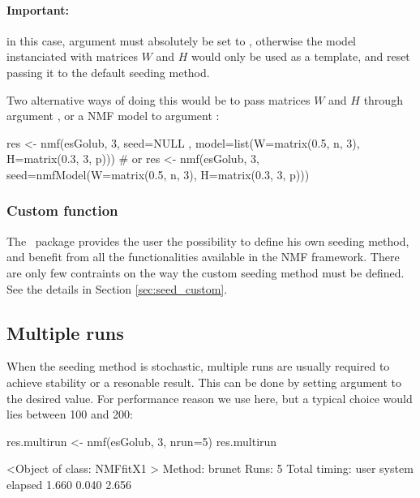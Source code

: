 \documentclass[a4paper]{article}
\newcommand{\nmfpack}{\code{NMF}\ }
\begin{document}
\paragraph{Important:} in this case, argument  must absolutely be set
 to , otherwise the model instanciated with matrices $W$ and $H$ 
 would only be used as a template, and reset passing it to the default seeding 
 method.

Two alternative ways of doing this would be to pass matrices $W$ and $H$ through 
argument , or a NMF model to argument :
\begin{Schunk}
\begin{Sinput}
 res <- nmf(esGolub, 3, seed=NULL
 		, model=list(W=matrix(0.5, n, 3), H=matrix(0.3, 3, p)))
 # or
 res <- nmf(esGolub, 3, seed=nmfModel(W=matrix(0.5, n, 3), H=matrix(0.3, 3, p)))
\end{Sinput}
\end{Schunk}


\subsubsection{Custom function}
The \nmfpack package provides the user the possibility to define his own seeding 
method, and benefit from all the functionalities available in the NMF framework.
There are only few contraints on the way the custom seeding method must be defined.
See the details in Section \ref{sec:seed_custom}.

\subsection{Multiple runs}

When the seeding method is stochastic, multiple runs are usually required to 
achieve stability or a resonable result.
This can be done by setting argument  to the desired value. 
For performance reason we use  here, but a typical choice 
would lies between 100 and 200:  

\begin{Schunk}
\begin{Sinput}
 res.multirun <- nmf(esGolub, 3, nrun=5)
 res.multirun
\end{Sinput}
\begin{Soutput}
<Object of class: NMFfitX1 >
  Method: brunet 
  Runs:  5 
  Total timing:
   user  system elapsed 
  1.660   0.040   2.656 
\end{Soutput}
\end{Schunk}
\end{document}
